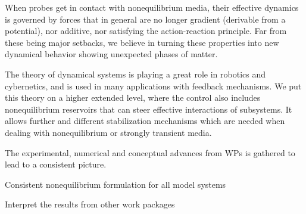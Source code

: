 \begin{workpackage}[id=WPcore,wphases=0-48,
  short=Gen. Theory, %
  title=General Theory, %
  lead=KUL,
  KULRM=66,UNIPDRM=8,TUERM=18,ULEIRM=6,USTUTTRM=6]
\begin{mdframed}
\printbibliography[heading=proposal-bib,env=proposal-env]

\end{mdframed}

\begin{tasklist}

\begin{task}[title=Give the theory of statistical forces outside equilibrium,id=core-t1,lead=KUL,partners={UNIPD},wphases={0-24!0.5,12-30}]
When probes get in contact with nonequilibrium media, their effective dynamics is governed
by forces that in general are no longer gradient (derivable from a potential), nor additive,
nor satisfying the action-reaction principle. Far from these being major setbacks, we
believe in turning these properties into new dynamical behavior showing unexpected phases of
matter.
\end{task}

\begin{task}[title=Formulate stability and control theory,id=core-t2,lead=KUL,partners={TUE},wphases={12-36!0.5,36-42}]
The theory of dynamical systems is playing a great role in robotics and cybernetics, and is
used in many applications with feedback mechanisms. We put this theory on a higher extended
level, where the control also includes nonequilibrium reservoirs that can steer effective
interactions of subsystems.
%
It allows further and different stabilization mechanisms which are needed when dealing with
nonequilibrium or strongly transient media.
\end{task}

\begin{task}[title=Consolidate other WPs,id=core-t3,lead=KUL,partners={TUE,UNIPD,USTUTT,TUE},wphases={36-48}]
The experimental, numerical and conceptual advances from WPs is gathered to lead to a
consistent picture.
\end{task}

\end{tasklist}

\begin{wpdelivs}
  \begin{wpdeliv}[due=18,id=core-d1,dissem=PU,nature=DEM,lead=KUL,miles=framework]
      {Consistent nonequilibrium formulation for all model systems}
  \end{wpdeliv}
  \begin{wpdeliv}[due=36,id=core-d2,dissem=PU,nature=DEM,lead=KUL,miles=final]
      {Interpret the results from other work packages}
  \end{wpdeliv}
\end{wpdelivs}

\end{workpackage}
